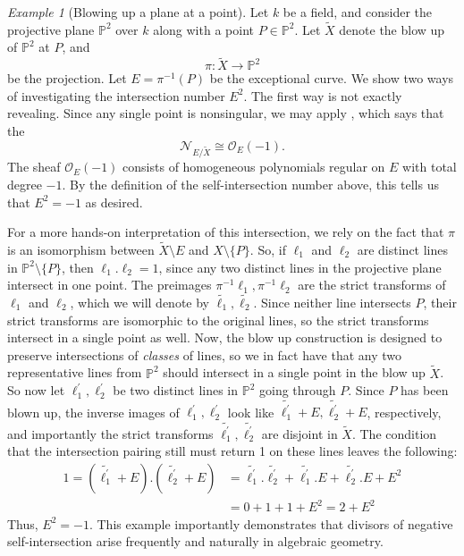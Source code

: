\documentclass[12pt,twoside]{reedthesis}
\theoremstyle{plain}
\theoremstyle{definition}
\theoremstyle{remark}
\newtheorem{example}{Example}[section]
\newcommand{\Proj}{\mathbb{P}}
\newcommand{\calO}{\mathcal{O}}
\begin{document}
\begin{example}[Blowing up a plane at a point]
Let $k$ be a field, and consider the projective plane $\Proj^2$ over $k$ along with a point $P\in\Proj^2$. Let $\widetilde{X}$ denote the blow up of $\Proj^2$ at $P$, and 
\[\pi:\widetilde{X}\to\Proj^2\] 
be the projection. Let $E=\pi^{-1}(P)$ be the exceptional curve. We show two ways of investigating the intersection number $E^2$. The first way is not exactly revealing. Since any single point is nonsingular, we may apply \cite[Theorem II.8.24c]{hartshorne}, which says that the 
\[\mathscr{N}_{E/\widetilde{X}} \cong\calO_{E}(-1).\] The sheaf $\calO_E(-1)$ consists of homogeneous polynomials regular on $E$ with total degree $-1$. By the definition of the self-intersection number above, this tells us that $E^2=-1$ as desired.

For a more hands-on interpretation of this intersection, we rely on the fact that $\pi$ is an isomorphism between $\widetilde{X}\setminus E$ and $X\setminus \{P\}$. So, if $\ell_1$ and $\ell_2$ are distinct lines in $\Proj^2\setminus\{P\}$, then $\ell_1.\ell_2=1$, since any two distinct lines in the projective plane intersect in one point. The preimages $\pi^{-1}\ell_1,\pi^{-1}\ell_2$ are the strict transforms of $\ell_1$ and $\ell_2$, which we will denote by $\widetilde{\ell_1},\widetilde{\ell_2}$. Since neither line intersects $P$, their strict transforms are isomorphic to the original lines, so the strict transforms intersect in a single point as well. Now, the blow up construction is designed to preserve intersections of \emph{classes} of lines, so we in fact have that any two representative lines from $\Proj^2$ should intersect in a single point in the blow up $\widetilde{X}$. So now let $\ell_1^\prime,\ell_2^\prime$ be two distinct lines in $\Proj^2$ going through $P$. Since $P$ has been blown up, the inverse images of $\ell_1^\prime, \ell_2^\prime$ look like $\widetilde{\ell_1^\prime}+E,\widetilde{\ell_2^\prime}+E$, respectively, and importantly the strict transforms $\widetilde{\ell_1^\prime},\widetilde{\ell_2^\prime}$ are disjoint in $\widetilde{X}$. The condition that the intersection pairing still must return 1 on these lines leaves the following:
\begin{align*}
1=(\widetilde{\ell_1^\prime}+E).(\widetilde{\ell_2^\prime}+E)&=\widetilde{\ell_1^\prime}.\widetilde{\ell_2^\prime}+\widetilde{\ell_1^\prime}.E+\widetilde{\ell_2^\prime}.E+E^2\\
&=0+1+1+E^2=2+E^2
\end{align*}
Thus, $E^2=-1$. This example importantly demonstrates that divisors of negative self-intersection arise frequently and naturally in algebraic geometry.
\end{example}
\end{document}
